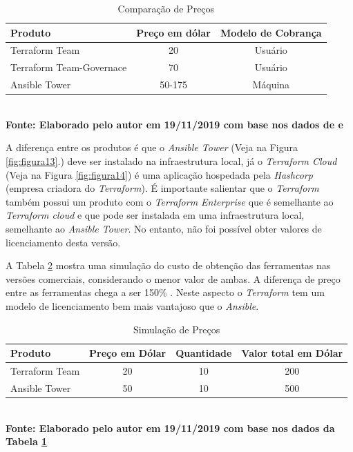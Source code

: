    \begin{table}[H]
	\centering
	\caption{\hspace{0.1cm} Comparação de Preços}
	\vspace{-0.3cm} %
	\label{tab:tabela6}
	\begin{tabular}{l|c|c}
  \hline
    \textbf{Produto}	& \textbf{Preço em dólar} & \textbf{Modelo de Cobrança} \\
    \hline
  Terraform Team & 20  & Usuário\\
  Terraform Team-Governace  & 70 &   Usuário  \\
  Ansible Tower  & 50-175 &   Máquina  \\
     \hline
 \end{tabular}
 	\vspace{.1cm}  %
	\small
	{\footnotesize\\ \textbf{Fonte: Elaborado pelo autor em 19/11/2019 com base nos dados de \textit{\cite{opensource.io}} e  \textit{\cite{hashcorp3}}}}
\end{table}

A diferença entre os produtos é que o \textit{Ansible Tower} (Veja na Figura \ref{fig:figura13}.) deve ser instalado na infraestrutura local, já o \textit{Terraform Cloud} (Veja na Figura \ref{fig:figura14})  é uma aplicação hospedada pela \textit{Hashcorp} (empresa criadora do \textit{Terraform}). É importante salientar que o \textit{Terraform} também possui um produto com o \textit{Terraform Enterprise} que é semelhante ao \textit{Terraform cloud} e  que pode ser instalada em uma infraestrutura local, semelhante ao \textit{Ansible Tower}. No entanto, não foi possível obter valores de licenciamento desta versão.  


A Tabela \ref{tab:tabela7} mostra uma simulação  do custo de obtenção das ferramentas nas versões comerciais, considerando o menor valor de ambas. A diferença de preço entre as ferramentas chega a ser 150\% . Neste aspecto o \textit{Terraform} tem um modelo de licenciamento bem mais vantajoso que o \textit{Ansible}.  


   \begin{table}[H]
	\centering
	\caption{\hspace{0.1cm} Simulação de Preços}
	\vspace{-0.3cm} %
	\label{tab:tabela7}
	\begin{tabular}{l|c|c|c}
  \hline
    \textbf{Produto} & \textbf{Preço em Dólar} & \textbf{Quantidade}  & \textbf{Valor total em Dólar} \\
    \hline
  Terraform Team & 20  & 10 & 200\\
  Ansible Tower  & 50 & 10 & 500\\
     \hline
 \end{tabular}
 	\vspace{.1cm}  %
	\small
	{\footnotesize\\ \textbf{Fonte: Elaborado pelo autor em 19/11/2019 com base nos dados da Tabela \ref{tab:tabela6}}}
\end{table}

